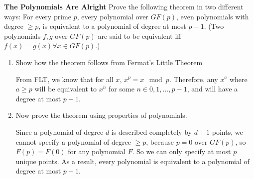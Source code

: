 \question \textbf{The Polynomials Are Alright}\newline
Prove the following theorem in two different ways: \newline
For every prime $p$, every polynomial over $GF(p)$, even polynomials with degree $\geq p$, is equivalent to a polynomial of degree at most $p - 1$. (Two polynomials $f,g$ over $GF(p)$ are said to be equivalent iff $f(x) = g(x) \forall x \in GF(p)$.) 
\begin{enumerate}[label=(\alph*)]
\item Show how the theorem follows from Fermat's Little Theorem
\begin{solution}
From FLT, we know that for all $x$, $x^p = x \mod p$. Therefore, any $x^a$ where $a \geq p$ will be equivalent to $x^n$ for some $n \in {0, 1, \dotsc, p -1}$, and will have a degree at most $p-1$.
\end{solution}

\item Now prove the theorem using properties of polynomials.
\begin{solution}
Since a polynomial of degree $d$ is described completely by $d+1$ points, we cannot specify a polynomial of degree $\geq p$, because $p = 0$ over $GF(p)$, so $F(p) = F(0)$ for any polynomial $F$. So we can only specify at most $p$ unique points. As a result, every polynomial is equivalent to a polynomial of degree at most $p -1$.
\end{solution}

\end{enumerate}